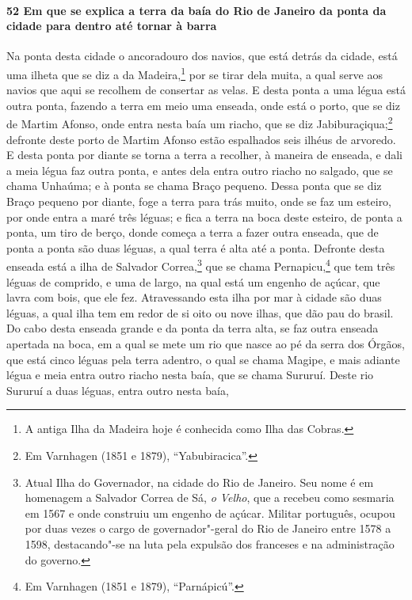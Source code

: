 \paragraph{52 Em que se explica a terra da baía do Rio de Janeiro da ponta da cidade para
dentro até tornar à barra}

Na ponta desta cidade o ancoradouro dos navios, que está detrás da cidade, está uma ilheta
que se diz a da Madeira,\footnote{ A antiga Ilha da Madeira hoje é conhecida como Ilha das
Cobras.} por se tirar dela muita, a qual serve aos navios que aqui se recolhem de
consertar as velas. E desta ponta a uma légua está outra ponta, fazendo a terra em meio
uma enseada, onde está o porto, que se diz de Martim Afonso, onde entra nesta baía um
riacho, que se diz Jabiburaçiqua;\footnote{ Em Varnhagen (1851 e 1879), ``Yabubiracica''.}
defronte deste porto de Martim Afonso estão espalhados seis ilhéus de arvoredo. E desta
ponta por diante se torna a terra a recolher, à maneira de enseada, e dali a meia légua
faz outra ponta, e antes dela entra outro riacho no salgado, que se chama Unhaúma; e à
ponta se chama Braço pequeno. Dessa ponta que se diz Braço pequeno por diante, foge a
terra para trás muito, onde se faz um esteiro, por onde entra a maré três léguas; e fica a
terra na boca deste esteiro, de ponta a ponta, um tiro de berço, donde começa a terra a
fazer outra enseada, que de ponta a ponta são duas léguas, a qual terra é alta até a
ponta. Defronte desta enseada está a ilha de Salvador Correa,\footnote{ Atual Ilha do
Governador, na cidade do Rio de Janeiro. Seu nome é em homenagem a Salvador Correa de Sá,
\textit{o Velho}, que a recebeu como sesmaria em 1567 e onde construiu um engenho de
açúcar. Militar português, ocupou por duas vezes o cargo de governador"-geral do Rio de
Janeiro entre 1578 a 1598, destacando"-se na luta pela expulsão dos franceses e na
administração do governo.} que se chama Pernapicu,\footnote{ Em Varnhagen (1851 e 1879),
``Parnápicú''.} que tem três léguas de comprido, e uma de largo, na qual está um engenho
de açúcar, que lavra com bois, que ele fez. Atravessando esta ilha por mar à cidade são
duas léguas, a qual ilha tem em redor de si oito ou nove ilhas, que dão pau do brasil. Do
cabo desta enseada grande e da ponta da terra alta, se faz outra enseada apertada na boca,
em a qual se mete um rio que nasce ao pé da serra dos Órgãos, que está cinco léguas pela
terra adentro, o qual se chama Magipe, e mais adiante légua e meia entra outro riacho
nesta baía, que se chama Sururuí. Deste rio Sururuí a duas léguas, entra outro nesta baía,
